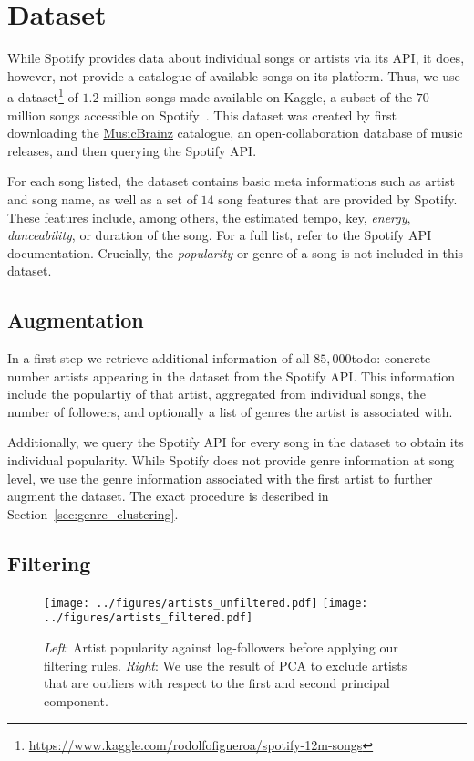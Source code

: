 \documentclass{article}
\newcommand{\todo}[1]{{\color{red}todo: #1}}
\begin{document}
\section{Dataset}

While Spotify provides data about individual songs or artists via its API, it does, however, not provide a catalogue of available songs on its platform. Thus, we use a dataset\footnote{\url{https://www.kaggle.com/rodolfofigueroa/spotify-12m-songs}} of $1.2$ million songs made available on Kaggle, a subset of the $70$ million songs accessible on Spotify~\cite{ingham_2020}. This dataset was created by first downloading the \href{https://musicbrainz.org/}{MusicBrainz} catalogue, an open-collaboration database of music releases, and then querying the Spotify API. 

For each song listed, the dataset contains basic meta informations such as artist and song name, as well as a set of $14$ song features that are provided by Spotify. These features include, among others, the estimated tempo, key, \emph{energy}, \emph{danceability}, or duration of the song. For a full list, refer to the Spotify API documentation. Crucially, the \emph{popularity} or genre of a song is not included in this dataset.

\subsection{Augmentation}
In a first step we retrieve additional information of all $85,000$\todo{concrete number} artists appearing in the dataset from the Spotify API. This information include the populartiy of that artist, aggregated from individual songs, the number of followers, and optionally a list of genres the artist is associated with.

Additionally, we query the Spotify API for every song in the dataset to obtain its individual popularity. While Spotify does not provide genre information at song level, we use the genre information associated with the first artist to further augment the dataset. The exact procedure is described in Section~\ref{sec:genre_clustering}. 

\subsection{Filtering}

\begin{figure}[t]
  \centering
  \texttt{[image: ../figures/artists\_unfiltered.pdf]}
  \qquad
  \texttt{[image: ../figures/artists\_filtered.pdf]}
  \caption{\textit{Left}: Artist popularity against log-followers before applying our filtering rules. \textit{Right}: We use the result of PCA to exclude artists that are outliers with respect to the first and second principal component.}
  \label{fig:filtering}
\end{figure}
\end{document}
